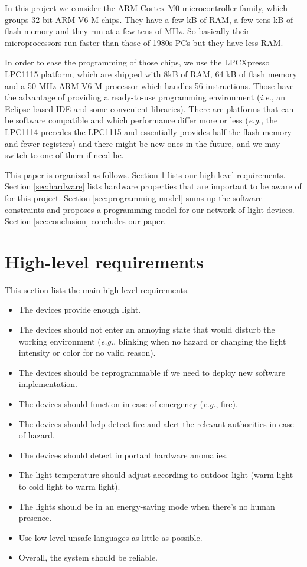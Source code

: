 \documentclass[12pt,twoside,a4paper]{article}
\def\eg{\emph{e.g.}}
\def\ie{\emph{i.e.}}
\begin{document}
In this project we consider  the ARM Cortex M0 microcontroller family,
which groups 32-bit ARM  V6-M chips. They have a few kB  of RAM, a few
tens  kB of  flash memory  and they  run  at a  few tens  of MHz.   So
basically their microprocessors run faster than those of 1980s PCs but
they have less RAM.

In order to ease the programming of those chips, we use the LPCXpresso
LPC1115 platform,  which are shipped with  8kB of RAM, 64  kB of flash
memory and a 50 MHz  ARM V6-M processor which handles 56 instructions.
Those  have  the advantage  of  providing  a ready-to-use  programming
environment (\ie, an Eclipse-based IDE and some convenient libraries).
There  are  platforms  that  can  be  software  compatible  and  which
performance differ more or less (\eg, the LPC1114 precedes the LPC1115
and   essentially   provides  half   the   flash   memory  and   fewer
registers\cite{LPC111X,UM10398}) and  there might  be new ones  in the
future, and we may switch to one of them if need be.

This paper is organized as follows.
Section \ref{sec:HLR} lists our high-level requirements.
Section \ref{sec:hardware} lists hardware properties that are important
to be aware of for this project.
Section \ref{sec:programming-model} sums up the software constraints
and proposes a programming model for our network of light devices.
Section \ref{sec:conclusion} concludes our paper.

\section{High-level requirements}
\label{sec:HLR}

This section lists the main high-level requirements.

\begin{itemize}
\item The devices provide enough light.
\item The devices should not enter an annoying state that would
  disturb the working environment (\eg, blinking when no hazard or
  changing the light intensity or color for no valid reason).
\item The devices should be reprogrammable if we need to deploy new
  software implementation.
\item The devices should function in case of emergency (\eg, fire).
\item The devices should help detect fire and alert the relevant
  authorities in case of hazard.
\item The devices should detect important hardware anomalies.
\item The light temperature should adjust according to outdoor light
  (warm light to cold light to warm light).
\item The lights should be in an energy-saving mode when there's no
  human presence.
\item Use low-level unsafe languages as little as possible.
\item Overall, the system should be reliable.
\end{itemize}
\end{document}
